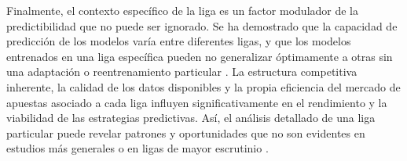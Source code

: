 Finalmente, el contexto específico de la liga es un factor modulador de la predictibilidad que no puede ser ignorado.
Se ha demostrado que la capacidad de predicción de los modelos varía entre diferentes ligas, y que los modelos entrenados en una liga específica pueden no generalizar óptimamente a otras sin una adaptación o reentrenamiento particular \cite{Malamatinos2022GreekLeague}.
La estructura competitiva inherente, la calidad de los datos disponibles y la propia eficiencia del mercado de apuestas asociado a cada liga influyen significativamente en el rendimiento y la viabilidad de las estrategias predictivas. Así, el análisis detallado de una liga particular puede revelar patrones y oportunidades que no son evidentes en estudios más generales o en ligas de mayor escrutinio \cite{Beretta2023OptimalAlgorithmTournaments}.